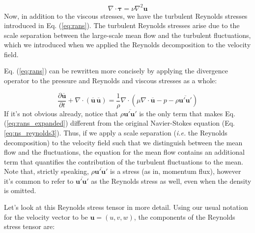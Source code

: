 \documentclass[12pt]{article}
\numberwithin{equation}{section}
\numberwithin{figure}{section}
\numberwithin{table}{section}
\begin{document}
\begin{equation}
  \nabla \cdot \boldsymbol{\tau} = \nu \nabla^2 \mathbf{u}
\end{equation}
Now, in addition to the viscous stresses, we have the turbulent Reynolds stresses
introduced in Eq. (\ref{eq:rans}).
The turbulent Reynolds stresses arise due to the scale separation between the
large-scale mean flow and the turbulent fluctuations, which we introduced when
we applied the Reynolds decomposition to the velocity field.

Eq. (\ref{eq:rans}) can be rewritten more concisely by applying the divergence
operator to the pressure and Reynolds and viscous stresses as a whole:

\begin{equation}
  \frac{\partial \overline{\mathbf{u}}}{\partial t} +
  \nabla \cdot (\overline{\mathbf{u}}\, \overline{\mathbf{u}}) =
  \frac{1}{\rho} \nabla \cdot \left( \mu \nabla \cdot \overline{\mathbf{u}} - p - \rho \overline{\mathbf{u}' \mathbf{u}'} \right)
  \label{eq:rans_expanded}
\end{equation}
If it's not obvious already, notice that $\rho \overline{\mathbf{u}' \mathbf{u}'}$
is the only term that makes Eq. (\ref{eq:rans_expanded}) different from the
original Navier-Stokes equation (Eq. \ref{eq:ns_reynolds3}).
Thus, if we apply a scale separation (\textit{i.e.} the Reynolds decomposition)
to the velocity field such that we distinguish between the mean flow and the
fluctuations, the equation for the mean flow contains an additional term that
quantifies the contribution of the turbulent fluctuations to the mean.
Note that, strictly speaking, $\rho \overline{\mathbf{u}' \mathbf{u}'}$ is a
stress (as in, momentum flux), however it's common to refer to
$\overline{\mathbf{u}' \mathbf{u}'}$ as the Reynolds stress as well, even when
the density is omitted.

Let's look at this Reynolds stress tensor in more detail.
Using our usual notation for the velocity vector to be $\mathbf{u} = (u, v, w)$,
the components of the Reynolds stress tensor are:
\end{document}
